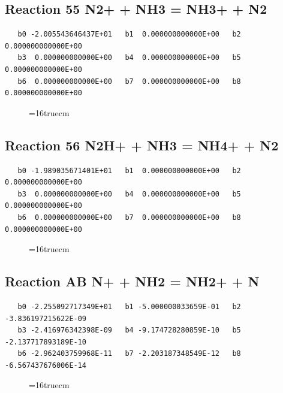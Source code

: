 \documentclass[12pt,dvipdfm]{article}
\begin{document}
\subsection{
Reaction 55 N2+ + NH3 = NH3+ + N2 }
\begin{small}\begin{verbatim}
   b0 -2.005543646437E+01   b1  0.000000000000E+00   b2  0.000000000000E+00
   b3  0.000000000000E+00   b4  0.000000000000E+00   b5  0.000000000000E+00
   b6  0.000000000000E+00   b7  0.000000000000E+00   b8  0.000000000000E+00
\end{verbatim}\end{small}
\begin{figure}[h!] \label{n2rates}
\epsfxsize=16truecm
\end{figure}
\newpage

\subsection{
Reaction 56 N2H+ + NH3 = NH4+ + N2 }
\begin{small}\begin{verbatim}
   b0 -1.989035671401E+01   b1  0.000000000000E+00   b2  0.000000000000E+00
   b3  0.000000000000E+00   b4  0.000000000000E+00   b5  0.000000000000E+00
   b6  0.000000000000E+00   b7  0.000000000000E+00   b8  0.000000000000E+00
\end{verbatim}\end{small}
\begin{figure}[h!] \label{n2rates}
\epsfxsize=16truecm
\end{figure}
\newpage

\subsection{
Reaction AB N+ + NH2 = NH2+ + N }
\begin{small}\begin{verbatim}
   b0 -2.255092717349E+01   b1 -5.000000033659E-01   b2 -3.836197215622E-09
   b3 -2.416976342398E-09   b4 -9.174728280859E-10   b5 -2.137717893189E-10
   b6 -2.962403759968E-11   b7 -2.203187348549E-12   b8 -6.567437676006E-14
\end{verbatim}\end{small}
\begin{figure}[h!] \label{n2rates}
\epsfxsize=16truecm
\end{figure}
\newpage
\end{document}
